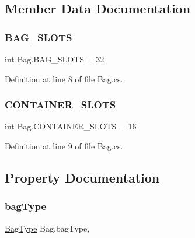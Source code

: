 \subsection{Member Data Documentation}
\mbox{\label{class_bag_aa3277af2938bf5bc9447535318668ced}} 
\subsubsection{\texorpdfstring{BAG\_SLOTS}{BAG\_SLOTS}}
{\footnotesize\ttfamily int Bag.\+B\+A\+G\+\_\+\+S\+L\+O\+TS = 32\hspace{0.3cm}{\ttfamily [static]}}



Definition at line 8 of file Bag.\+cs.

\mbox{\label{class_bag_ac513120e71acce6fffca5d0e78733182}} 
\subsubsection{\texorpdfstring{CONTAINER\_SLOTS}{CONTAINER\_SLOTS}}
{\footnotesize\ttfamily int Bag.\+C\+O\+N\+T\+A\+I\+N\+E\+R\+\_\+\+S\+L\+O\+TS = 16\hspace{0.3cm}{\ttfamily [static]}}



Definition at line 9 of file Bag.\+cs.



\subsection{Property Documentation}
\mbox{\label{class_bag_a84ac63a7f36a20bc22ab8c2de86babcc}} 
\subsubsection{\texorpdfstring{bagType}{bagType}}
{\footnotesize\ttfamily \mbox{\hyperlink{class_bag_a5a827c44705d57202edc93b9a39316c7}{Bag\+Type}} Bag.\+bag\+Type\hspace{0.3cm}{\ttfamily [get]}, {\ttfamily [set]}}



